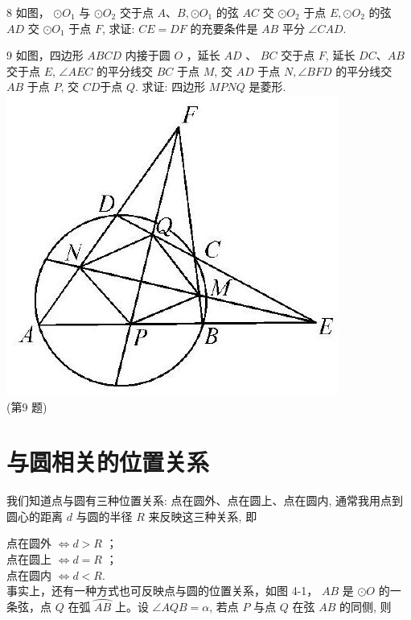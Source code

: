 \documentclass[10pt]{article}
\begin{document}
8 如图， $\odot O_{1}$ 与 $\odot O_{2}$ 交于点 $A 、 B, \odot O_{1}$ 的弦 $A C$ 交 $\odot O_{2}$ 于点 $E, \odot O_{2}$ 的弦 $A D$ 交 $\odot O_{1}$ 于点 $F$, 求证: $C E=D F$ 的充要条件是 $A B$ 平分 $\angle C A D$.

9 如图，四边形 $A B C D$ 内接于圆 $O$ ，延长 $A D$ 、 $B C$ 交于点 $F$, 延长 $D C 、 A B$ 交于点 $E$, $\angle A E C$ 的平分线交 $B C$ 于点 $M$, 交 $A D$ 于点 $N, \angle B F D$ 的平分线交 $A B$ 于点 $P$, 交 $C D$于点 $Q$. 求证: 四边形 $M P N Q$ 是菱形.\\
\includegraphics[max width=\textwidth, center]{2024_10_30_66b8e5e701da2093c133g-028}\\
(第9 题)

\section*{与圆相关的位置关系}
我们知道点与圆有三种位置关系: 点在圆外、点在圆上、点在圆内, 通常我用点到圆心的距离 $d$ 与圆的半径 $R$ 来反映这三种关系, 即

点在圆外 $\Leftrightarrow d>R$ ；\\
点在圆上 $\Leftrightarrow d=R$ ；\\
点在圆内 $\Leftrightarrow d<R$.\\
事实上，还有一种方式也可反映点与圆的位置关系，如图 4-1， $A B$ 是 $\odot O$ 的一条弦，点 $Q$ 在弧 $\overparen{A B}$ 上。设 $\angle A Q B=\alpha$, 若点 $P$ 与点 $Q$ 在弦 $A B$ 的同侧, 则
\end{document}
